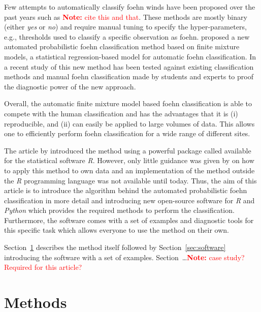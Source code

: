 \documentclass[article,nojss,shortnames]{jss}
\newcommand{\note}[1]{\textcolor{red}{\textbf{Note:} #1}}
\begin{document}
Few attempts to automatically classify foehn winds have been proposed over the
past years such as \note{cite this and that}. These methods are mostly binary
(either \textit{yes} or \textit{no}) and require manual tuning to specify the
hyper-parameters, e.g., thresholds used to classify a specific observation as
foehn. \cite{plavcan2014} proposed a new automated probabilistic foehn
classification method based on finite mixture models, a statistical
regression-based model for automatic foehn classification. In a recent study of
\cite{mayr2018unpublished} this new method has been tested against existing
classification methods and manual foehn classification made by students and
experts to proof the diagnostic power of the new approach.

Overall, the automatic finite mixture model based foehn classification
\citep{plavcan2014} is able to compete with the human classification
\citep{mayr2018unpublished} and has the advantages that it is (i) reproducible,
and (ii) can easily be applied to large volumes of data. This allows one to
efficiently perform foehn classification for a wide range of different sites.

The article by \citep{plavcan2014} introduced the method using a powerful
package called  \citep{leisch2004,gruen2007,gruen2008} available
for the statistical software \textit{R}.  However, only little guidance was
given by \citep{plavcan2014} on how to apply this method to own data and an
implementation of the method outside the \textit{R} programming language was
not available until today.  Thus, the aim of this article is to introduce the
algorithm behind the automated probabilistic foehn classification
\citep{plavcan2014} in more detail and introducing new open-source software for
\textit{R} and \textit{Python} which provides the required methods to perform
the classification.  Furthermore, the software comes with a set of examples and
diagnostic tools for this specific task which allows everyone to use the method
on their own.

Section~\ref{sec:methods} describes the method itself followed by
Section~\ref{sec:software}  introducing the software with a set of
examples. Section~\dots \note{case study? Required for this article?}


\section{Methods}\label{sec:methods}
\end{document}
